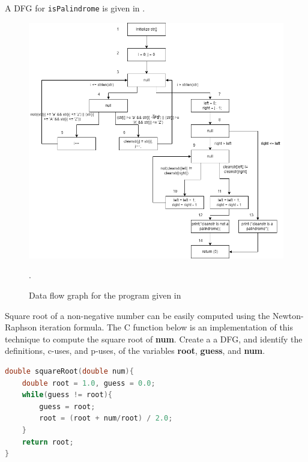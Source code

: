 A DFG for \lstinline!isPalindrome! is given in .
\begin{figure}[!ht]
    \includegraphics{images/dfg-1.png}
    \caption{Data flow graph for the program given in }.
\end{figure}

\begin{example}
Square root of a non-negative number can be easily computed using the Newton-Raphson iteration formula. The C function below is an implementation of this technique to compute the square root of \textbf{num}. Create a a DFG, and identify the definitions, c-uses, and p-uses, of the variables \textbf{root}, \textbf{guess}, and \textbf{num}.

\begin{lstlisting}[language=C, caption={A C function to compute the positive square root of a real number.}]
double squareRoot(double num){
    double root = 1.0, guess = 0.0;
    while(guess != root){
        guess = root;
        root = (root + num/root) / 2.0;
    }
    return root;
}
\end{lstlisting}
\end{example}

